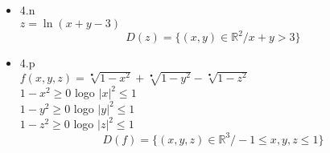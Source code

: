 \documentclass{article}
\begin{document}
\begin{itemize}
		\item 4.n
		\\$z = \ln (x+y-3)$
		$$D(z) = \{(x,y) \in \mathbb{R}^2 / x+y > 3\}$$
		\item 4.p
		\\$f(x,y,z)=\sqrt[•]{1-x^2}+\sqrt[•]{1-y^2}-\sqrt[•]{1-z^2}$
		\\$1-x^2\geq 0$   logo    $|x|^2 \leq 1$
		\\$1-y^2 \geq 0$  logo    $|y|^2 \leq 1$
		\\$1-z^2 \geq 0$  logo    $|z|^2 \leq 1$
		$$D(f)=\{(x,y,z) \in \mathbb{R}^3 / -1\leq x,y,z \leq 1\}$$
	\end{itemize}
%
\end{document}
